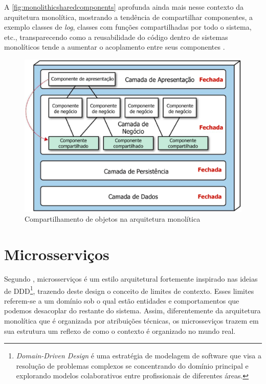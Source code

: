A \autoref{fig:monolithicsharedcomponents} aprofunda ainda mais nesse contexto da arquitetura
monolítica, mostrando a tendência de compartilhar componentes, a exemplo classes de \textit{log},
classes com funções compartilhadas por todo o sistema, etc., transparecendo como a reusabilidade do
código dentro de sistemas monolíticos tende a aumentar o acoplamento entre seus componentes
\cite{Richards2020:FundamentalsOfSoftwareArchitecture}.

\begin{figure}[h]
  \centering
  \includegraphics[keepaspectratio=true,scale=0.4]{figuras/mono-shared-components-translated.eps}
    \caption{Compartilhamento de objetos na arquitetura monolítica
    \label{fig:monolithicsharedcomponents} }
\end{figure}

\section{Microsserviços}

Segundo , microsserviços é um estilo
arquitetural fortemente inspirado nas ideias de \gls{DDD}\footnote{\textit{Domain-Driven Design} é
uma estratégia de modelagem de software que visa a resolução de problemas complexos se concentrando
do domínio principal e explorando modelos colaborativos entre profissionais de diferentes áreas.},
trazendo deste design o conceito de limites de contexto. Esses limites referem-se a um domínio sob
o qual estão entidades e comportamentos que podemos desacoplar do restante do sistema. Assim,
diferentemente da arquitetura monolítica que é organizada por atribuições técnicas, os microsseviços
trazem em sua estrutura um reflexo de como o contexto é organizado no mundo real.

